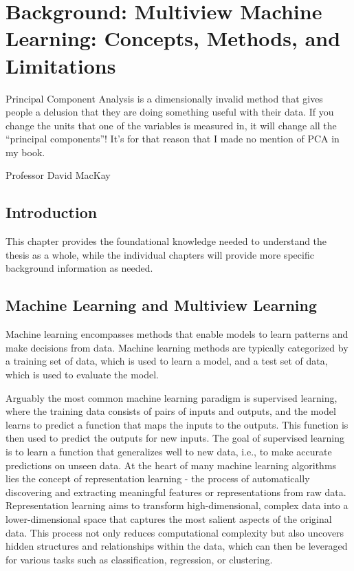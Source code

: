 \graphicspath{{chapters/background/}}


\chapter{Background: Multiview Machine Learning: Concepts, Methods, and Limitations}\label{ch:background}
 \epigraph{Principal Component Analysis is a dimensionally invalid method that gives people a delusion that they are doing something useful with their data. If you change the units that one of the variables is measured in, it will change all the “principal components”! It’s for that reason that I made no mention of PCA in my book.}{Professor David MacKay}
\minitoc

\section{Introduction}

This chapter provides the foundational knowledge needed to understand the thesis as a whole, while the individual chapters will provide more specific background information as needed.

\section{Machine Learning and Multiview Learning}

Machine learning encompasses methods that enable models to learn patterns and make decisions from data. Machine learning methods are typically categorized by a training set of data, which is used to learn a model, and a test set of data, which is used to evaluate the model.

Arguably the most common machine learning paradigm is supervised learning, where the training data consists of pairs of inputs and outputs, and the model learns to predict a function that maps the inputs to the outputs. This function is then used to predict the outputs for new inputs. The goal of supervised learning is to learn a function that generalizes well to new data, i.e., to make accurate predictions on unseen data.
At the heart of many machine learning algorithms lies the concept of representation learning - the process of automatically discovering and extracting meaningful features or representations from raw data. Representation learning aims to transform high-dimensional, complex data into a lower-dimensional space that captures the most salient aspects of the original data. This process not only reduces computational complexity but also uncovers hidden structures and relationships within the data, which can then be leveraged for various tasks such as classification, regression, or clustering.

